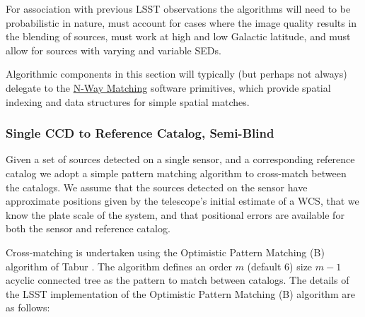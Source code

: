 For association with previous LSST observations the algorithms will
need to be probabilistic in nature, must account for cases where the
image quality results in the blending of sources, must work at high
and low Galactic latitude, and must allow for sources with varying and
variable SEDs.

Algorithmic components in this section will typically (but perhaps not always) delegate to the \hyperref[sec:spTablesNWayMatching]{N-Way Matching} software primitives, which provide spatial indexing and data structures for simple spatial matches.

\subsubsection{Single CCD to Reference Catalog, Semi-Blind}
\label{sec:acSingleCCDReferenceMatching}

Given a set of sources detected on a single sensor, and a
corresponding reference catalog we adopt a simple pattern matching
algorithm to cross-match between the catalogs.  We assume that the
sources detected on the sensor have approximate positions given by the
telescope's initial estimate of a WCS, that we know the plate scale of
the system, and that positional errors are available for both the
sensor and reference catalog.  

Cross-matching is undertaken using the Optimistic Pattern Matching (B) algorithm of Tabur \cite{tabur2007}. The algorithm defines an order $m$ (default 6) size $m-1$ acyclic connected tree as the pattern to match between catalogs. The details of the LSST implementation of the Optimistic Pattern Matching (B) algorithm are as follows:

